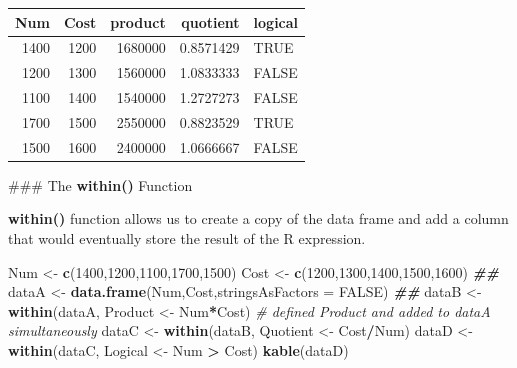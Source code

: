 \documentclass[
]{book}
\newenvironment{Shaded}{\begin{snugshade}}{\end{snugshade}}
\newcommand{\AttributeTok}[1]{\textcolor[rgb]{0.13,0.29,0.53}{#1}}
\newcommand{\CommentTok}[1]{\textcolor[rgb]{0.56,0.35,0.01}{\textit{#1}}}
\newcommand{\ConstantTok}[1]{\textcolor[rgb]{0.56,0.35,0.01}{#1}}
\newcommand{\DecValTok}[1]{\textcolor[rgb]{0.00,0.00,0.81}{#1}}
\newcommand{\DocumentationTok}[1]{\textcolor[rgb]{0.56,0.35,0.01}{\textbf{\textit{#1}}}}
\newcommand{\FunctionTok}[1]{\textcolor[rgb]{0.13,0.29,0.53}{\textbf{#1}}}
\newcommand{\NormalTok}[1]{#1}
\newcommand{\OtherTok}[1]{\textcolor[rgb]{0.56,0.35,0.01}{#1}}
\newcommand{\SpecialCharTok}[1]{\textcolor[rgb]{0.81,0.36,0.00}{\textbf{#1}}}
\begin{document}
\begin{Shaded}
\end{Shaded}

\begin{tabular}{r|r|r|r|l}
\hline
Num & Cost & product & quotient & logical\\
\hline
1400 & 1200 & 1680000 & 0.8571429 & TRUE\\
\hline
1200 & 1300 & 1560000 & 1.0833333 & FALSE\\
\hline
1100 & 1400 & 1540000 & 1.2727273 & FALSE\\
\hline
1700 & 1500 & 2550000 & 0.8823529 & TRUE\\
\hline
1500 & 1600 & 2400000 & 1.0666667 & FALSE\\
\hline
\end{tabular}

\hfill\break
\#\#\# The \textbf{within()} Function

\textbf{within()} function allows us to create a copy of the data frame and add a column that would eventually store the result of the R expression.

\begin{Shaded}
\begin{Highlighting}[]
\NormalTok{Num }\OtherTok{\textless{}{-}} \FunctionTok{c}\NormalTok{(}\DecValTok{1400}\NormalTok{,}\DecValTok{1200}\NormalTok{,}\DecValTok{1100}\NormalTok{,}\DecValTok{1700}\NormalTok{,}\DecValTok{1500}\NormalTok{)}
\NormalTok{Cost }\OtherTok{\textless{}{-}} \FunctionTok{c}\NormalTok{(}\DecValTok{1200}\NormalTok{,}\DecValTok{1300}\NormalTok{,}\DecValTok{1400}\NormalTok{,}\DecValTok{1500}\NormalTok{,}\DecValTok{1600}\NormalTok{)}
\DocumentationTok{\#\#}
\NormalTok{dataA }\OtherTok{\textless{}{-}} \FunctionTok{data.frame}\NormalTok{(Num,Cost,}\AttributeTok{stringsAsFactors =} \ConstantTok{FALSE}\NormalTok{)}
\DocumentationTok{\#\#}
\NormalTok{dataB }\OtherTok{\textless{}{-}} \FunctionTok{within}\NormalTok{(dataA, Product }\OtherTok{\textless{}{-}}\NormalTok{ Num}\SpecialCharTok{*}\NormalTok{Cost)   }\CommentTok{\# defined Product and added to dataA simultaneously}
\NormalTok{dataC }\OtherTok{\textless{}{-}} \FunctionTok{within}\NormalTok{(dataB, Quotient }\OtherTok{\textless{}{-}}\NormalTok{ Cost}\SpecialCharTok{/}\NormalTok{Num)}
\NormalTok{dataD }\OtherTok{\textless{}{-}} \FunctionTok{within}\NormalTok{(dataC, Logical }\OtherTok{\textless{}{-}}\NormalTok{ Num }\SpecialCharTok{\textgreater{}}\NormalTok{ Cost)}
\FunctionTok{kable}\NormalTok{(dataD)}
\end{Highlighting}
\end{Shaded}
\end{document}
